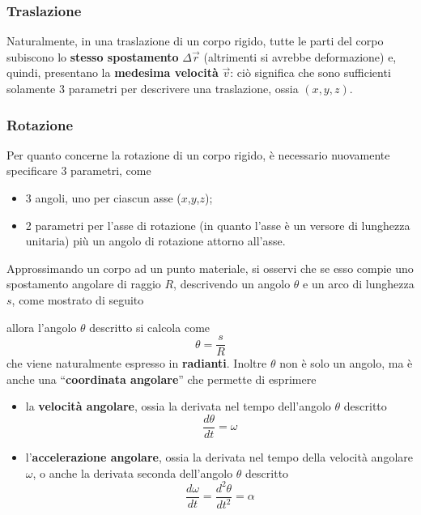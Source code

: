\documentclass[a4paper]{extarticle}
\newcommand{\quotes}[1]{``#1''}
\begin{document}
\vspace{1em}
\subsubsection{Traslazione}
Naturalmente, in una traslazione di un corpo rigido, tutte le parti del corpo subiscono lo \textbf{stesso spostamento} $\Delta \vec r$ (altrimenti si avrebbe deformazione) e, quindi, presentano la \textbf{medesima velocità} $\vec v$: ciò significa che sono sufficienti solamente $3$ parametri per descrivere una traslazione, ossia $(x,y,z)$.

\vspace{1em}
\subsubsection{Rotazione}
Per quanto concerne la rotazione di un corpo rigido, è necessario nuovamente specificare $3$ parametri, come
\begin{itemize}
  \item 3 angoli, uno per ciascun asse ($x$,$y$,$z$);
  \item 2 parametri per l'asse di rotazione (in quanto l'asse è un versore di lunghezza unitaria) più un angolo di rotazione attorno all'asse.
\end{itemize}
Approssimando un corpo ad un punto materiale, si osservi che se esso compie uno spostamento angolare di raggio $R$, descrivendo un angolo $\theta$ e un arco di lunghezza $s$, come mostrato di seguito

\begin{figure}[H]
  \centering
\end{figure}

\noindent
allora l'angolo $\theta$ descritto si calcola come
\[\boxed{\theta=\frac{s}{R}}\]
che viene naturalmente espresso in \textbf{radianti}. Inoltre $\theta$ non è solo un angolo, ma è anche una \quotes{\textbf{coordinata angolare}} che permette di esprimere
\begin{itemize}
  \item la \textbf{velocità angolare}, ossia la derivata nel tempo dell'angolo $\theta$ descritto
  \[\boxed{\dfrac{d\theta}{dt}=\omega}\]
  \item l'\textbf{accelerazione angolare}, ossia la derivata nel tempo della velocità angolare $\omega$, o anche la derivata seconda dell'angolo $\theta$ descritto
  \[\boxed{\dfrac{d\omega}{dt}=\dfrac{d^2\theta}{dt^2}=\alpha}\]
\end{itemize}
\end{document}
